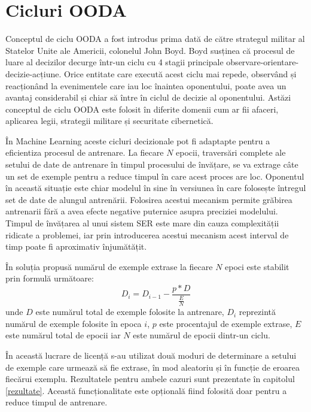 \documentclass[a4paper,12pt]{book}
\begin{document}
				\section{Cicluri OODA} \label{ooda}
				 Conceptul de ciclu OODA a fost introdus prima dată de către strategul militar al Statelor Unite ale Americii, colonelul John Boyd. Boyd susținea că procesul de luare al decizilor decurge într-un ciclu cu 4 stagii principale observare-orientare-decizie-acțiune. Orice entitate care execută acest ciclu mai repede, observând și reacționând la evenimentele care iau loc înaintea oponentului, poate avea un avantaj considerabil și chiar să între în ciclul de decizie al oponentului. Astăzi conceptul de ciclu OODA este folosit în diferite domenii cum ar fii afaceri, aplicarea legii, strategii militare și securitate cibernetică. \par
				 
				 În Machine Learning aceste cicluri decizionale pot fi adaptapte pentru a eficientiza procesul de antrenare. La fiecare $N$ epocii, traversări complete ale setului de date de antrenare în timpul procesului de învățare, se va extrage câte un set de exemple pentru a reduce timpul în care acest proces are loc. Oponentul în această situație este chiar modelul în sine în versiunea în care folosește întregul set de date de alungul antrenării.  Folosirea acestui mecanism permite grăbirea antrenarii fără a avea efecte negative puternice asupra preciziei modelului. Timpul de învățarea al unui sistem SER este mare din cauza complexității ridicate a problemei, iar prin introducerea acestui mecanism acest interval de timp poate fi aproximativ înjumătățit. \par
				 
				 În soluția propusă numărul de exemple extrase la fiecare $N$ epoci este stabilit prin formulă următoare:
				 \begin{equation}
				 	D_i = D_{i-1} - \frac{p * D}{\frac{E}{N}}
				 \end{equation}
				  unde $D$ este numărul total de exemple folosite la antrenare, $D_i$ reprezintă numărul de exemple folosite în epoca $i$, $p$ este procentajul de exemple extrase, $E$ este numărul total de epocii iar $N$ este numărul de epocii dintr-un ciclu. \par
				 În această lucrare de licență s-au utilizat două moduri de determinare a setului de exemple care urmează să fie extrase, în mod aleatoriu și în funcție de eroarea fiecărui exemplu. Rezultatele pentru ambele cazuri sunt prezentate în capitolul \ref{rezultate}. Această funcționalitate este opțională fiind folosită doar pentru a reduce timpul de antrenare.
\end{document}
